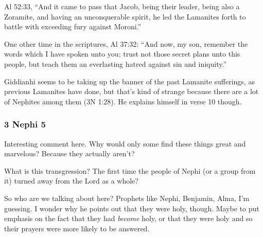 		\begin{compactdesc}
		
		\item[4$\vert$]
		\begin{compactdesc}
		\item[unconquerable spirit] Al 52:33, ``And it came to pass that Jacob, being their leader, being also a Zoramite, and having an unconquerable spirit, he led the Lamanites forth to battle with exceeding fury against Moroni.''
		\item[everlasting hatred] One other time in the scriptures, Al 37:32: ``And now, my son, remember the words which I have spoken unto you; trust not those secret plans unto this people, but teach them an everlasting hatred against sin and iniquity.''
		\item[many wrongs] Giddianhi seems to be taking up the banner of the past Lamanite sufferings, as previous Lamanites have done, but that's kind of strange because there are a lot of Nephites among them (3N 1:28). He explains himself in verse 10 though.
		\end{compactdesc}
		
		\end{compactdesc}
		
	\subsubsection{3 Nephi 5} %
	
		\begin{compactdesc}
		
		\item[8$\vert$]
		\begin{compactdesc}
		\item[in the eyes of some] Interesting comment here. Why would only some find these things great and marvelous? Because they actually aren't? 
		\end{compactdesc}
		
		\item[12$\vert$]
		\begin{compactdesc}
		\item[after their transgression] What is this transgression? The first time the people of Nephi (or a group from it) turned away from the Lord as a whole?
		\end{compactdesc}
		
		\item[14$\vert$]
		\begin{compactdesc}
		\item[who were the holy ones] So who are we talking about here? Prophets like Nephi, Benjamin, Alma, I'm guessing. I wonder why he points out that they were holy, though. Maybe to put emphasis on the fact that they had \textit{become} holy, or that they were holy and so their prayers were more likely to be answered.
		\end{compactdesc}
		
		\end{compactdesc}
		
